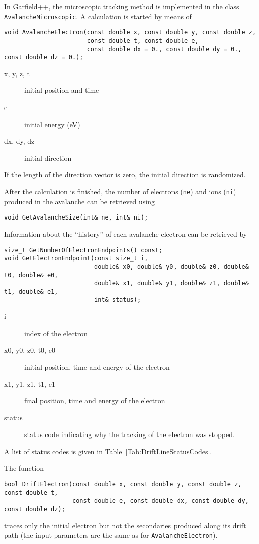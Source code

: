 In Garfield++, the microscopic tracking method is implemented in the class 
\texttt{AvalancheMicroscopic}. A calculation is started by means of
\begin{lstlisting}
void AvalancheElectron(const double x, const double y, const double z,
                       const double t, const double e,
                       const double dx = 0., const double dy = 0., const double dz = 0.);
\end{lstlisting}
\begin{description}
  \item[x, y, z, t] initial position and time
  \item[e] initial energy (eV)
  \item[dx, dy, dz] initial direction 
\end{description}
If the length of the direction vector is zero, 
the initial direction is randomized.

After the calculation is finished, the number of electrons 
(\texttt{ne}) and ions (\texttt{ni})  
produced in the avalanche can be retrieved using
\begin{lstlisting}
void GetAvalancheSize(int& ne, int& ni);
\end{lstlisting}
Information about the ``history'' of each avalanche electron can be 
retrieved by
\begin{lstlisting}
size_t GetNumberOfElectronEndpoints() const;
void GetElectronEndpoint(const size_t i, 
                         double& x0, double& y0, double& z0, double& t0, double& e0,
                         double& x1, double& y1, double& z1, double& t1, double& e1,
                         int& status); 
\end{lstlisting}
\begin{description}
  \item[i] index of the electron
  \item[x0, y0, z0, t0, e0] initial position, time and energy of the electron
  \item[x1, y1, z1, t1, e1] final position, time and energy of the electron
  \item[status] status code indicating why the tracking of the electron was stopped.  
\end{description}
A list of status codes is given in Table~\ref{Tab:DriftLineStatusCodes}.

The function
\begin{lstlisting}
bool DriftElectron(const double x, const double y, const double z, const double t,
                   const double e, const double dx, const double dy, const double dz);
\end{lstlisting}
traces only the initial electron but not the secondaries 
produced along its drift path 
(the input parameters are the same as for \texttt{AvalancheElectron}).

